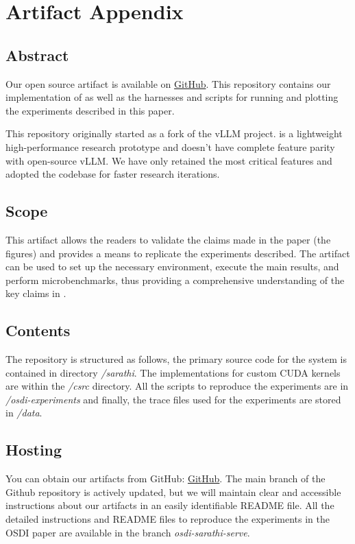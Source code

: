 
\appendix
\section{Artifact Appendix}

\subsection*{Abstract}
Our open source artifact is available on \href{https://github.com/microsoft/sarathi-serve}{GitHub}. This repository contains our implementation of \sysname as well as the harnesses and scripts for
running and plotting the experiments described in this paper.

This repository originally started as a fork of the vLLM project. \sysname is a  lightweight high-performance research prototype and doesn't have complete feature parity with open-source vLLM. We have only retained the most critical features and adopted the codebase for faster research iterations.

\subsection*{Scope}

This artifact allows the readers to validate the claims made
in the \sysname paper (the figures) and provides a means to replicate the experiments described. The artifact
can be used to set up the necessary environment, execute the
main results, and perform microbenchmarks, thus providing a comprehensive understanding of the key claims in \sysname. %

\subsection*{Contents}

The repository is structured as follows, the primary source code for the system is contained in directory \textit{/sarathi}. The implementations for custom CUDA kernels are within the \textit{/csrc} directory. All the scripts to reproduce the experiments are in \textit{/osdi-experiments} and finally, the trace files used for the experiments are stored in \textit{/data}.


\subsection*{Hosting}
You can obtain our artifacts from GitHub:
\href{https://github.com/microsoft/sarathi-serve}{GitHub}. The main branch of the Github repository is actively updated, but we will maintain clear and accessible instructions about our artifacts in an easily identifiable
README file. All the detailed instructions and README files to reproduce the experiments in the OSDI paper are available in the branch \textit{osdi-sarathi-serve}. 


